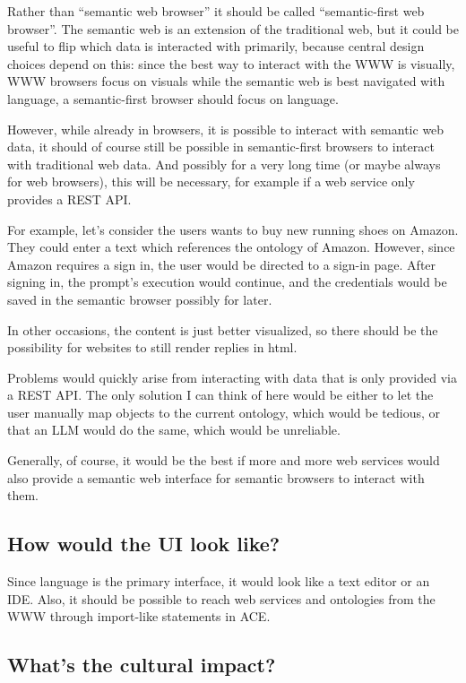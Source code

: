 \documentclass[12pt,a4paper]{article}
\begin{document}
Rather than ``semantic web browser'' it should be called ``semantic-first web browser''. The semantic web is an extension of the traditional web, but it could be useful to flip which data is interacted with primarily, because central design choices depend on this: since the best way to interact with the WWW is visually, WWW browsers focus on visuals while the semantic web is best navigated with language, a semantic-first browser should focus on language.

However, while already in browsers, it is possible to interact with semantic web data, it should of course still be possible in semantic-first browsers to interact with traditional web data. And possibly for a very long time (or maybe always for web browsers), this will be necessary, for example if a web service only provides a REST API.

For example, let's consider the users wants to buy new running shoes on Amazon. They could enter a text which references the ontology of Amazon. However, since Amazon requires a sign in, the user would be directed to a sign-in page. After signing in, the prompt's execution would continue, and the credentials would be saved in the semantic browser possibly for later.

In other occasions, the content is just better visualized, so there should be the possibility for websites to still render replies in html.

Problems would quickly arise from interacting with data that is only provided via a REST API. The only solution I can think of here would be either to let the user manually map objects to the current ontology, which would be tedious, or that an LLM would do the same, which would be unreliable.

Generally, of course, it would be the best if more and more web services would also provide a semantic web interface for semantic browsers to interact with them.

\subsection{How would the UI look like?}

Since language is the primary interface, it would look like a text editor or an IDE. Also, it should be possible to reach web services and ontologies from the WWW through import-like statements in ACE.

\subsection{What's the cultural impact?}
\end{document}
